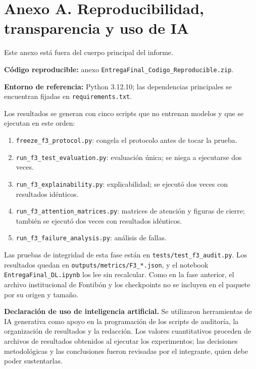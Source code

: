\documentclass[11pt,letterpaper]{article}
\begin{document}
\clearpage
\section*{Anexo A. Reproducibilidad, transparencia y uso de IA}

Este anexo está fuera del cuerpo principal del informe.

\textbf{Código reproducible:} anexo \texttt{EntregaFinal\_Codigo\_Reproducible.zip}.

\textbf{Entorno de referencia:} Python 3.12.10; las dependencias principales se encuentran fijadas en
\texttt{requirements.txt}.

Los resultados se generan con cinco scripts que no entrenan modelos y que se ejecutan en este orden:
\begin{enumerate}
\item \texttt{freeze\_f3\_protocol.py}: congela el protocolo antes de tocar la prueba.
\item \texttt{run\_f3\_test\_evaluation.py}: evaluación única; se niega a ejecutarse dos veces.
\item \texttt{run\_f3\_explainability.py}: explicabilidad; se ejecutó dos veces con resultados idénticos.
\item \texttt{run\_f3\_attention\_matrices.py}: matrices de atención y figuras de cierre; también se
  ejecutó dos veces con resultados idénticos.
\item \texttt{run\_f3\_failure\_analysis.py}: análisis de fallas.
\end{enumerate}
Las pruebas de integridad de esta fase están en \texttt{tests/test\_f3\_audit.py}.
Los resultados quedan en \texttt{outputs/metrics/F3\_*.json}, y el notebook \texttt{EntregaFinal\_DL.ipynb}
los lee sin recalcular. Como en la fase anterior, el archivo institucional de Fontibón y los checkpoints
no se incluyen en el paquete por su origen y tamaño.

\textbf{Declaración de uso de inteligencia artificial.} Se utilizaron herramientas de IA generativa como
apoyo en la programación de los scripts de auditoría, la organización de resultados y la redacción. Los
valores cuantitativos proceden de archivos de resultados obtenidos al ejecutar los experimentos; las
decisiones metodológicas y las conclusiones fueron revisadas por el integrante, quien debe poder
sustentarlas.
\end{document}
